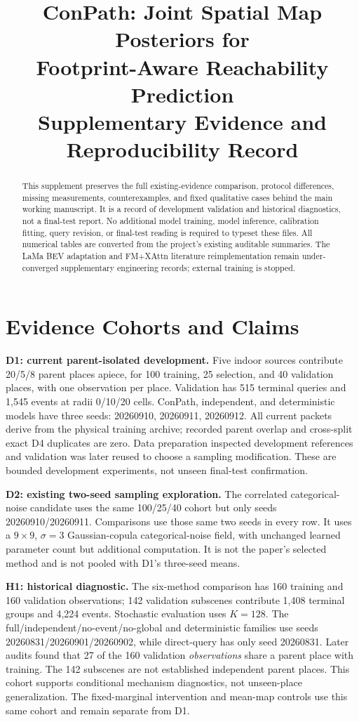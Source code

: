 \documentclass[conference,letterpaper,10pt,onecolumn]{IEEEtran}
\title{ConPath: Joint Spatial Map Posteriors for\\Footprint-Aware Reachability Prediction\\\large Supplementary Evidence and Reproducibility Record}
\author{\IEEEauthorblockN{Anonymous working draft}}
\begin{document}
\maketitle
\workingnote
\begin{abstract}
This supplement preserves the full existing-evidence comparison, protocol differences, missing measurements, counterexamples, and fixed qualitative cases behind the main working manuscript. It is a record of development validation and historical diagnostics, not a final-test report. No additional model training, model inference, calibration fitting, query revision, or final-test reading is required to typeset these files. All numerical tables are converted from the project's existing auditable summaries. The LaMa BEV adaptation and FM+XAttn literature reimplementation remain under-converged supplementary engineering records; external training is stopped.
\end{abstract}

\section{Evidence Cohorts and Claims}
\textbf{D1: current parent-isolated development.} Five indoor sources contribute 20/5/8 parent places apiece, for 100 training, 25 selection, and 40 validation places, with one observation per place. Validation has 515 terminal queries and 1,545 events at radii 0/10/20 cells. ConPath, independent, and deterministic models have three seeds: 20260910, 20260911, 20260912. All current packets derive from the physical training archive; recorded parent overlap and cross-split exact D4 duplicates are zero. Data preparation inspected development references and validation was later reused to choose a sampling modification. These are bounded development experiments, not unseen final-test confirmation.

\textbf{D2: existing two-seed sampling exploration.} The correlated categorical-noise candidate uses the same 100/25/40 cohort but only seeds 20260910/20260911. Comparisons use those same two seeds in every row. It uses a $9\times9$, $\sigma=3$ Gaussian-copula categorical-noise field, with unchanged learned parameter count but additional computation. It is not the paper's selected method and is not pooled with D1's three-seed means.

\textbf{H1: historical diagnostic.} The six-method comparison has 160 training and 160 validation observations; 142 validation subscenes contribute 1,408 terminal groups and 4,224 events. Stochastic evaluation uses $K=128$. The full/independent/no-event/no-global and deterministic families use seeds 20260831/20260901/20260902, while direct-query has only seed 20260831. Later audits found that 27 of the 160 validation \emph{observations} share a parent place with training. The 142 subscenes are not established independent parent places. This cohort supports conditional mechanism diagnostics, not unseen-place generalization. The fixed-marginal intervention and mean-map controls use this same cohort and remain separate from D1.
\end{document}
